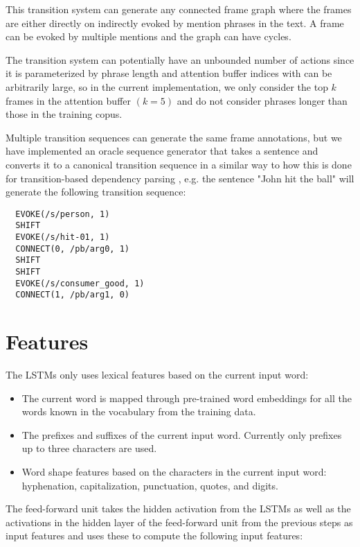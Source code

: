 \documentclass[11pt,a4paper]{article}
\begin{document}
This transition system can generate any connected frame graph where the frames
are either directly on indirectly evoked by mention phrases in the text. A frame
can be evoked by multiple mentions and the graph can have cycles.

The transition system can potentially have an unbounded number of actions since
it is parameterized by phrase length and attention buffer indices with can be
arbitrarily large, so in the current implementation, we only consider the
top $k$ frames in the attention buffer $(k=5)$ and do not consider phrases
longer than those in the training copus.

Multiple transition sequences can generate the same frame annotations, but we
have implemented an oracle sequence generator that takes a sentence and converts
it to a canonical transition sequence in a similar way to how this is done
for transition-based dependency parsing \cite{nivre2006}, e.g. the sentence
"John hit the ball" will generate the following transition sequence:
\begin{verbatim}
  EVOKE(/s/person, 1)
  SHIFT
  EVOKE(/s/hit-01, 1)
  CONNECT(0, /pb/arg0, 1)
  SHIFT
  SHIFT
  EVOKE(/s/consumer_good, 1)
  CONNECT(1, /pb/arg1, 0)
\end{verbatim}

\section{Features}
\label{sec:features}

The LSTMs only uses lexical features based on the current input word:

\begin{itemize}
  \item The current word is mapped through pre-trained word embeddings
  \cite{mikolov2013} for all the words known in the vocabulary from the
  training data.
  \item The prefixes and suffixes of the current input word. Currently only
  prefixes up to three characters are used.
  \item Word shape features based on the characters in the current input word:
  hyphenation, capitalization, punctuation, quotes, and digits.
\end{itemize}

The feed-forward unit takes the hidden activation from the LSTMs as well as the
activations in the hidden layer of the feed-forward unit from the previous steps
as input features and uses these to compute the following input features:
\end{document}
